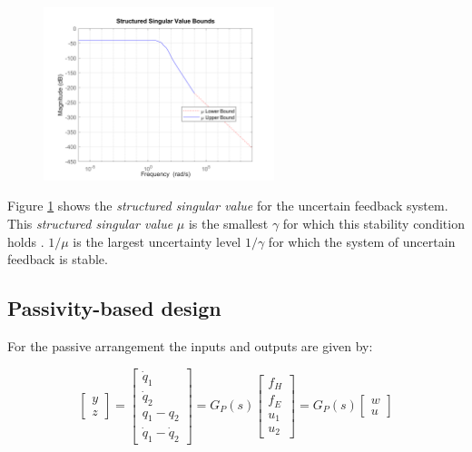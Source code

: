 \documentclass{article}
\begin{document}
\begin{figure}[H]
    \centering
    \includegraphics[width=0.6\textwidth]{figures/structured_singular_values.png}
    \caption{}
    \label{fig:structured_singular_values}
\end{figure}

Figure \ref{fig:structured_singular_values} shows the \textit{structured singular value} for the uncertain feedback system.
This \textit{structured singular value} $\mu$ is the smallest $\gamma$ for which this stability condition holds \cite{matlab_robustmu}.
$1/\mu$ is the largest uncertainty level $1/\gamma$ for which the system of uncertain feedback is stable.


\subsection{Passivity-based design}

For the passive arrangement the inputs and outputs are given by:

\begin{equation}
    \begin{bmatrix}
        y \\
        z
    \end{bmatrix} = \begin{bmatrix}
        \dot{q}_1 \\
        \dot{q}_2 \\
        q_1 - q_2 \\
        \dot{q}_1 - \dot{q}_2
    \end{bmatrix} = G_P(s) \begin{bmatrix}
        f_H \\
        f_E \\
        u_1 \\
        u_2
    \end{bmatrix} = G_P(s) \begin{bmatrix}
        w \\
        u
    \end{bmatrix}
\end{equation}
\end{document}
